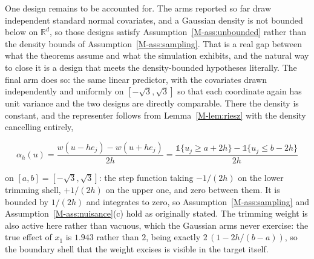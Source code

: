 \documentclass[12pt,a4paper]{article}
\numberwithin{equation}{section}
\theoremstyle{plain}
\theoremstyle{definition}
\newcommand{\R}{\mathbb{R}}
\begin{document}
	One design remains to be accounted for. The arms reported so far draw independent standard normal covariates, and a Gaussian density is not bounded below on $\R^d$, so those designs satisfy Assumption~\ref{M-ass:unbounded} rather than the density bounds of Assumption~\ref{M-ass:sampling}. That is a real gap between what the theorems assume and what the simulation exhibits, and the natural way to close it is a design that meets the density-bounded hypotheses literally. The final arm does so: the same linear predictor, with the covariates drawn independently and uniformly on $[-\sqrt{3}, \sqrt{3}]$ so that each coordinate again has unit variance and the two designs are directly comparable. There the density is constant, and the representer follows from Lemma~\ref{M-lem:riesz} with the density cancelling entirely,
	
	\begin{equation}
		\alpha_h(u) = \frac{w(u - h e_j) - w(u + h e_j)}{2h}
		= \frac{\mathbb{1}\{u_j \geq a + 2h\} - \mathbb{1}\{u_j \leq b - 2h\}}{2h}
		\label{eq:unifalpha}
	\end{equation}
	
	on $[a, b] = [-\sqrt{3}, \sqrt{3}]$: the step function taking $-1/(2h)$ on the lower trimming shell, $+1/(2h)$ on the upper one, and zero between them. It is bounded by $1/(2h)$ and integrates to zero, so Assumption~\ref{M-ass:sampling} and Assumption~\ref{M-ass:nuisance}(c) hold as originally stated. The trimming weight is also active here rather than vacuous, which the Gaussian arms never exercise: the true effect of $x_1$ is $1.943$ rather than $2$, being exactly $2\,(1 - 2h/(b-a))$, so the boundary shell that the weight excises is visible in the target itself.
	
\end{document}
